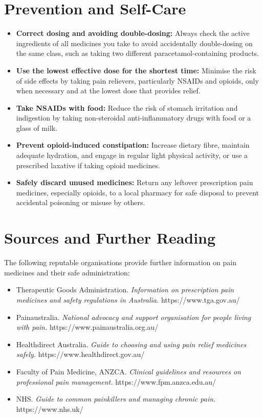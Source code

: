 \section*{Prevention and Self-Care}
\begin{itemize}
    \item \textbf{Correct dosing and avoiding double-dosing:} Always check the active ingredients of all medicines you take to avoid accidentally double-dosing on the same class, such as taking two different paracetamol-containing products.
    \item \textbf{Use the lowest effective dose for the shortest time:} Minimise the risk of side effects by taking pain relievers, particularly NSAIDs and opioids, only when necessary and at the lowest dose that provides relief.
    \item \textbf{Take NSAIDs with food:} Reduce the risk of stomach irritation and indigestion by taking non-steroidal anti-inflammatory drugs with food or a glass of milk.
    \item \textbf{Prevent opioid-induced constipation:} Increase dietary fibre, maintain adequate hydration, and engage in regular light physical activity, or use a prescribed laxative if taking opioid medicines.
    \item \textbf{Safely discard unused medicines:} Return any leftover prescription pain medicines, especially opioids, to a local pharmacy for safe disposal to prevent accidental poisoning or misuse by others.
\end{itemize}

\section*{Sources and Further Reading}
The following reputable organisations provide further information on pain medicines and their safe administration:
\begin{itemize}
    \item Therapeutic Goods Administration. \textit{Information on prescription pain medicines and safety regulations in Australia.} https://www.tga.gov.au/
    \item Painaustralia. \textit{National advocacy and support organisation for people living with pain.} https://www.painaustralia.org.au/
    \item Healthdirect Australia. \textit{Guide to choosing and using pain relief medicines safely.} https://www.healthdirect.gov.au/
    \item Faculty of Pain Medicine, ANZCA. \textit{Clinical guidelines and resources on professional pain management.} https://www.fpm.anzca.edu.au/
    \item NHS. \textit{Guide to common painkillers and managing chronic pain.} https://www.nhs.uk/
\end{itemize}
